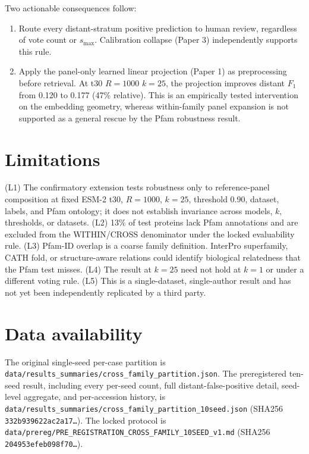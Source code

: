 \documentclass[11pt]{article}
\begin{document}
Two actionable consequences follow:
\begin{enumerate}
\item Route every distant-stratum positive prediction to human review, regardless of vote count or $s_{\max}$. Calibration collapse (Paper 3) independently supports this rule.
\item Apply the panel-only learned linear projection (Paper 1) as preprocessing before retrieval. At t30 $R{=}1000$ $k{=}25$, the projection improves distant $F_1$ from 0.120 to 0.177 (47\% relative). This is an empirically tested intervention on the embedding geometry, whereas within-family panel expansion is not supported as a general rescue by the Pfam robustness result.
\end{enumerate}

\section{Limitations}
(L1) The confirmatory extension tests robustness only to reference-panel composition at fixed ESM-2 t30, $R=1000$, $k=25$, threshold 0.90, dataset, labels, and Pfam ontology; it does not establish invariance across models, $k$, thresholds, or datasets.
(L2) 13\% of test proteins lack Pfam annotations and are excluded from the WITHIN/CROSS denominator under the locked evaluability rule.
(L3) Pfam-ID overlap is a coarse family definition. InterPro superfamily, CATH fold, or structure-aware relations could identify biological relatedness that the Pfam test misses.
(L4) The result at $k=25$ need not hold at $k=1$ or under a different voting rule.
(L5) This is a single-dataset, single-author result and has not yet been independently replicated by a third party.

\section{Data availability}
The original single-seed per-case partition is \texttt{data/results\_summaries/cross\_family\_partition.json}. The preregistered ten-seed result, including every per-seed count, full distant-false-positive detail, seed-level aggregate, and per-accession history, is \texttt{data/results\_summaries/cross\_family\_partition\_10seed.json} (SHA256 \texttt{332b939622ac2a17\ldots}). The locked protocol is \texttt{data/prereg/PRE\_REGISTRATION\_CROSS\_FAMILY\_10SEED\_v1.md} (SHA256 \texttt{204953efeb098f70\ldots}).



\end{document}
